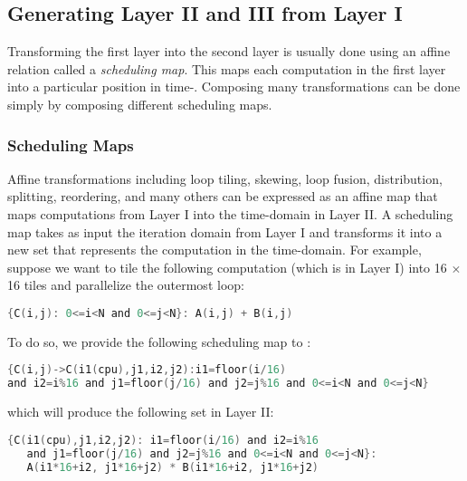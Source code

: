 \vspace{-0.25cm}
\subsection{Generating Layer II and III from Layer I}

Transforming the first layer into the second layer is usually done using an affine relation called a \emph{scheduling map}. This maps each computation in the first layer into a particular position in time-\processor. Composing many transformations can be done simply by composing different scheduling maps.

\vspace{-0.25cm}
\subsubsection{Scheduling Maps}

Affine transformations including loop tiling, skewing, loop fusion, distribution, splitting, reordering, and many others can be expressed as an affine map that maps computations from Layer I into the time-\processor domain in Layer II.
A scheduling map takes as input the iteration domain from Layer I and transforms it into a new set that represents the computation in the time-\processor domain.
For example, suppose we want to tile the following computation (which is in Layer I) into 16 $\times$ 16 tiles and parallelize the outermost loop:
\begin{lstlisting}[language=C,escapechar=@,numbers=none]
{C(i,j): 0<=i<N and 0<=j<N}: A(i,j) + B(i,j)
\end{lstlisting}

To do so, we provide the following scheduling map to \framework:

\begin{lstlisting}[language=C,escapechar=@,numbers=none]
{C(i,j)->C(i1(cpu),j1,i2,j2):i1=floor(i/16)
and i2=i%16 and j1=floor(j/16) and j2=j%16 and 0<=i<N and 0<=j<N}
\end{lstlisting}

\noindent %
which will produce the following set in Layer II: %

\begin{lstlisting}[language=C,escapechar=@,numbers=none]
{C(i1(cpu),j1,i2,j2): i1=floor(i/16) and i2=i%16
   and j1=floor(j/16) and j2=j%16 and 0<=i<N and 0<=j<N}:
   A(i1*16+i2, j1*16+j2) * B(i1*16+i2, j1*16+j2)
\end{lstlisting}

